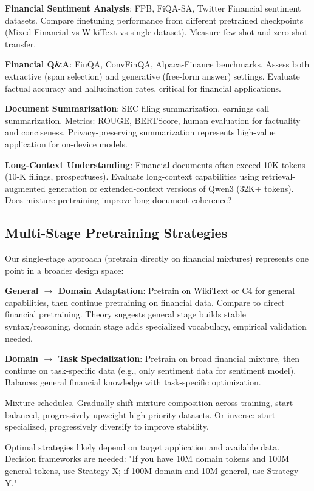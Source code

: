\textbf{Financial Sentiment Analysis}: FPB, FiQA-SA, Twitter Financial sentiment datasets. Compare finetuning performance from different pretrained checkpoints (Mixed Financial vs WikiText vs single-dataset). Measure few-shot and zero-shot transfer.

\textbf{Financial Q\&A}: FinQA, ConvFinQA, Alpaca-Finance benchmarks. Assess both extractive (span selection) and generative (free-form answer) settings. Evaluate factual accuracy and hallucination rates, critical for financial applications.

\textbf{Document Summarization}: SEC filing summarization, earnings call summarization. Metrics: ROUGE, BERTScore, human evaluation for factuality and conciseness. Privacy-preserving summarization represents high-value application for on-device models.

\textbf{Long-Context Understanding}: Financial documents often exceed 10K tokens (10-K filings, prospectuses). Evaluate long-context capabilities using retrieval-augmented generation or extended-context versions of Qwen3 (32K+ tokens). Does mixture pretraining improve long-document coherence?

\subsection{Multi-Stage Pretraining Strategies}

Our single-stage approach (pretrain directly on financial mixtures) represents one point in a broader design space:

\textbf{General $\rightarrow$ Domain Adaptation}: Pretrain on WikiText or C4 for general capabilities, then continue pretraining on financial data. Compare to direct financial pretraining. Theory suggests general stage builds stable syntax/reasoning, domain stage adds specialized vocabulary, empirical validation needed.

\textbf{Domain $\rightarrow$ Task Specialization}: Pretrain on broad financial mixture, then continue on task-specific data (e.g., only sentiment data for sentiment model). Balances general financial knowledge with task-specific optimization.

Mixture schedules. Gradually shift mixture composition across training, start balanced, progressively upweight high-priority datasets. Or inverse: start specialized, progressively diversify to improve stability.

Optimal strategies likely depend on target application and available data. Decision frameworks are needed: "If you have 10M domain tokens and 100M general tokens, use Strategy X; if 100M domain and 10M general, use Strategy Y."

